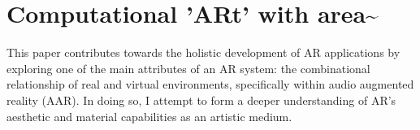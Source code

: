 


\section{Computational 'ARt' with area\textasciitilde{}} \label{sec: area-intro-area}
This paper contributes towards the holistic development of AR applications by exploring one of the main attributes of an AR system: the combinational relationship of real and virtual environments, specifically within audio augmented reality (AAR). In doing so, I attempt to form a deeper understanding of AR's aesthetic and material capabilities as an artistic medium.

